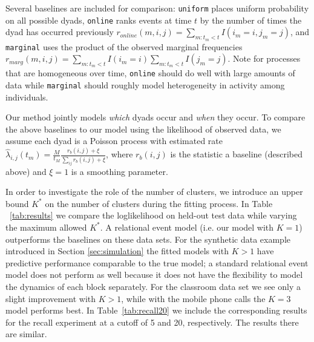 { \scriptsize


}

Several baselines are included for comparison: \texttt{uniform} places uniform probability on all possible dyads, \texttt{online} ranks events at time $t$ by the number of times the dyad has occurred previously $r_{online}(m,i,j) = \sum_{m:t_m < t} I(i_m=i,j_m=j)$, and \texttt{marginal} uses the product of the observed marginal frequencies $r_{marg}(m,i,j) = \sum_{m:t_m < t} I(i_m=i) \sum_{m:t_m < t} I(j_m=j)$.
Note for processes that are homogeneous over time, \texttt{online} should do well with large amounts of data while \texttt{marginal} should roughly model heterogeneity in activity among individuals.

Our method jointly models \emph{which} dyads occur and \emph{when} they occur.
To compare the above baselines to our model using the likelihood of observed data, we assume each dyad is a Poisson process with estimated  rate $\hat{\lambda}_{i,j}(t_m) = \frac{M}{t_M} \frac{r_{b}(i,j) + \xi}{\sum_{ij} r_{b}(i,j) + \xi}$, where $r_b(i,j)$ is the statistic a baseline (described above) and $\xi=1$ is a smoothing parameter.

In order to investigate the role of the number of clusters, we introduce an upper bound $K^*$ on the number of clusters during the fitting process.  In Table ~\ref{tab:results} we compare the loglikelihood on held-out test data while varying the maximum allowed $K^*$.  A relational event model (i.e. our model with $K=1$) outperforms the baselines on these data sets.  For the synthetic data example introduced in Section \ref{sec:simulation} the fitted models with $K>1$ have predictive performance comparable to the true model; a standard relational event model does not perform as well because it does not have the flexibility to model the dynamics of each block separately.  For the classroom data set we see only a slight improvement with $K>1$, while with the mobile phone calls the $K=3$ model performs best.
In Table~\ref{tab:recall20} we include the corresponding results for the recall experiment at a cutoff of 5 and 20, respectively.  The results there are similar.




